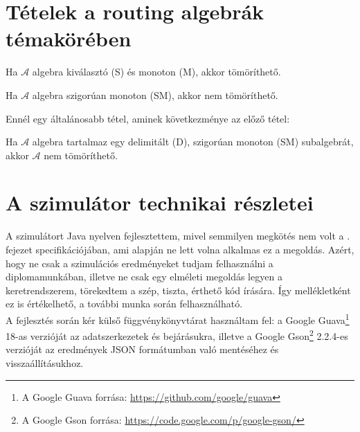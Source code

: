   \section{Tételek a routing algebrák témakörében}\label{algebratetelek}
  \begin{theorem} [Tömöríthetőség 1]\label{eq:algebratetel1}
    Ha $\mathcal{A}$ algebra kiválasztó (S) és monoton (M), akkor tömöríthető.
  \end{theorem}

  \begin{theorem} [Tömöríthetőség 2]\label{eq:algebratetel2}
    Ha $\mathcal{A}$ algebra szigorúan monoton (SM), akkor nem tömöríthető.
  \end{theorem}

  Ennél egy általánosabb tétel, aminek következménye az előző tétel:
  \begin{theorem} [Tömöríthetőség 3]\label{eq:algebratetel3}
    Ha $\mathcal{A}$ algebra tartalmaz egy delimitált (D), szigorúan monoton (SM) subalgebrát, akkor $\mathcal{A}$ nem tömöríthető.
  \end{theorem}
  \newpage

  \section{A szimulátor technikai részletei}\label{simulator}
  A szimulátort Java nyelven fejlesztettem, mivel semmilyen megkötés nem volt a . fejezet specifikációjában, ami alapján ne lett volna alkalmas ez a megoldás. Azért, hogy ne csak a szimulációs eredményeket tudjam felhasználni a diplomamunkában, illetve ne csak egy elméleti megoldás legyen a keretrendszerem, törekedtem a szép, tiszta, érthető kód írására. Így mellékletként ez is értékelhető, a további munka során felhasználható.\\

  A fejlesztés során kér külső függvénykönyvtárat használtam fel: a Google Guava\footnote{A Google Guava forrása: \href{https://github.com/google/guava}{https://github.com/google/guava}} 18-as verzióját az adatszerkezetek és bejárásukra, illetve a Google Gson\footnote{A Google Gson forrása: \href{https://code.google.com/p/google-gson/}{https://code.google.com/p/google-gson/}} 2.2.4-es verzióját az eredmények JSON formátumban való mentéséhez és visszaállításukhoz.

